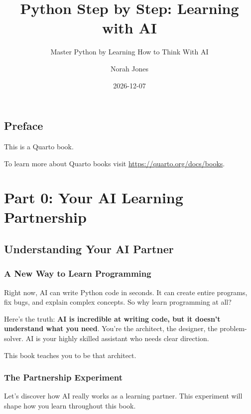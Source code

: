 \documentclass[
  letterpaper,
  DIV=11,
  numbers=noendperiod,
  oneside]{scrreprt}
\title{Python Step by Step: Learning with AI}
\subtitle{Master Python by Learning How to Think With AI}
\author{Norah Jones}
\date{2026-12-07}
\renewcommand*\contentsname{Table of contents}
\newcommand\contentsname{Table of contents}
\begin{document}
\maketitle

\renewcommand*\contentsname{Table of contents}
{
\hypersetup{linkcolor=}
\setcounter{tocdepth}{2}
\tableofcontents
}

\chapter*{Preface}\label{preface}


This is a Quarto book.

To learn more about Quarto books visit
\url{https://quarto.org/docs/books}.

\part{Part 0: Your AI Learning Partnership}

\chapter{Understanding Your AI
Partner}\label{sec-understanding-ai-partner}

\section{A New Way to Learn
Programming}\label{a-new-way-to-learn-programming}

Right now, AI can write Python code in seconds. It can create entire
programs, fix bugs, and explain complex concepts. So why learn
programming at all?

Here's the truth: \textbf{AI is incredible at writing code, but it
doesn't understand what you need}. You're the architect, the designer,
the problem-solver. AI is your highly skilled assistant who needs clear
direction.

This book teaches you to be that architect.

\section{The Partnership Experiment}\label{the-partnership-experiment}

Let's discover how AI really works as a learning partner. This
experiment will shape how you learn throughout this book.
\end{document}

